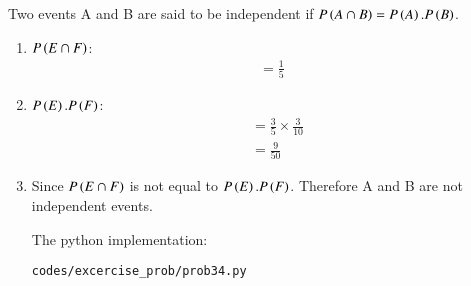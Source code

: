 \renewcommand{\theequation}{\theenumi}

\begin{theorem}
Two events A and B are said to be independent if $P\left(A \cap B\right) = P\left(A\right).P\left(B\right)$.
\end{theorem}


\begin{enumerate}

\item $P\left(E \cap F\right)$:
\begin{align}
= \frac{1}{5} 
\end{align}

\item $P\left(E\right).P\left(F\right)$:
\begin{align}
&=\frac{3}{5} \times \frac{3}{10}\\
&= \frac{9}{50}
\end{align}

\item Since $P\left(E \cap F\right)$ is not equal to $P\left(E\right).P\left(F\right)$. Therefore A and B are not independent events.

The python implementation:
\begin{lstlisting}
codes/excercise_prob/prob34.py
\end{lstlisting}

\end{enumerate}
